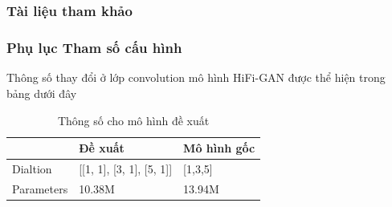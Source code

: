 \documentclass{beamer}
\numberwithin{figure}{section}
\numberwithin{table}{section}
\begin{document}
\section{}
\begin{frame}[allowframebreaks]
\frametitle{Tài liệu tham khảo}
% 
\printbibliography

\end{frame}

\appendix

\begin{frame}
\frametitle{Phụ lục Tham số cấu hình}
Thông số thay đổi ở lớp convolution mô hình HiFi-GAN được thể hiện trong bảng dưới đây
\begin{table}
\begin{tabular}{l l l}
\toprule
\textbf{} & \textbf{Đề xuất} & \textbf{Mô hình gốc}\\
\midrule
Dialtion & [[1, 1], [3, 1], [5, 1]] & [1,3,5] \\
Parameters & 10.38M & 13.94M \\
\bottomrule
\end{tabular}
\caption{Thông số cho mô hình đề xuất}
\end{table}
\end{frame}
\end{document}
